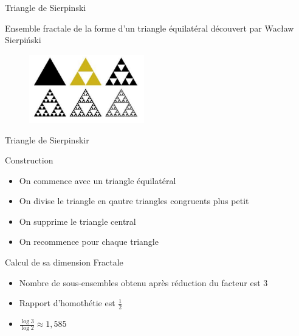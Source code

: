 \documentclass{beamer}
\begin{document}
\begin{frame}{Triangle de Sierpinski}
\begin{block}{}
Ensemble fractale de la forme d'un triangle équilatéral découvert par Wacław Sierpiński
\end{block}
\begin{figure}[H]
  \centering
  \includegraphics[width=50mm]{triangle.PNG}
 \end{figure}
\end{frame}

\begin{frame}{Triangle de Sierpinskir}
\begin{block}{Construction}
    \begin{itemize}
        \item On commence avec un triangle équilatéral 
        \item On divise le triangle en qautre triangles congruents plus petit
        \item On supprime le triangle central
        \item On recommence pour chaque triangle
    \end{itemize}
\end{block}
\begin{block}{Calcul de sa dimension Fractale}
    \begin{itemize}
        \item Nombre de sous-ensembles obtenu après réduction du facteur est 3
        \item Rapport d'homothétie est $\frac{1}{2}$
        \item $\frac{\log 3}{\log 2} \approx 1,585$
    \end{itemize}
\end{block}
\end{frame}
\end{document}
